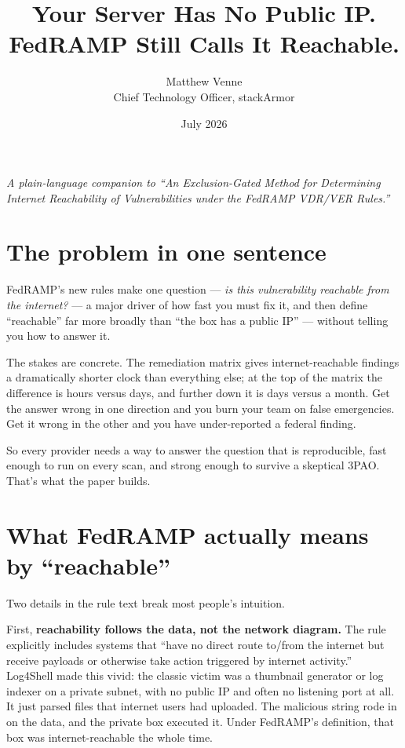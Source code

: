\documentclass[11pt]{article}
\title{\bfseries Your Server Has No Public IP.\\ FedRAMP Still Calls It Reachable.}
\author{Matthew Venne \\ \small Chief Technology Officer, stackArmor}
\date{July 2026}
\begin{document}
\maketitle

\begin{center}
\itshape A plain-language companion to ``An Exclusion-Gated Method for Determining
Internet Reachability of Vulnerabilities under the FedRAMP VDR/VER Rules.''
\end{center}

\bigskip

\section*{The problem in one sentence}
FedRAMP's new rules make one question --- \emph{is this vulnerability reachable
from the internet?} --- a major driver of how fast you must fix it, and then define
``reachable'' far more broadly than ``the box has a public IP'' --- without telling
you how to answer it.

The stakes are concrete. The remediation matrix gives internet-reachable findings a
dramatically shorter clock than everything else; at the top of the matrix the
difference is hours versus days, and further down it is days versus a month. Get
the answer wrong in one direction and you burn your team on false emergencies. Get
it wrong in the other and you have under-reported a federal finding.

So every provider needs a way to answer the question that is reproducible, fast
enough to run on every scan, and strong enough to survive a skeptical 3PAO. That's
what the paper builds.

\section*{What FedRAMP actually means by ``reachable''}
Two details in the rule text break most people's intuition.

First, \textbf{reachability follows the data, not the network diagram.} The rule
explicitly includes systems that ``have no direct route to/from the internet but
receive payloads or otherwise take action triggered by internet activity.''
Log4Shell made this vivid: the classic victim was a thumbnail generator or log
indexer on a private subnet, with no public IP and often no listening port at all.
It just parsed files that internet users had uploaded. The malicious string rode in
on the data, and the private box executed it. Under FedRAMP's definition, that box
was internet-reachable the whole time.
\end{document}
